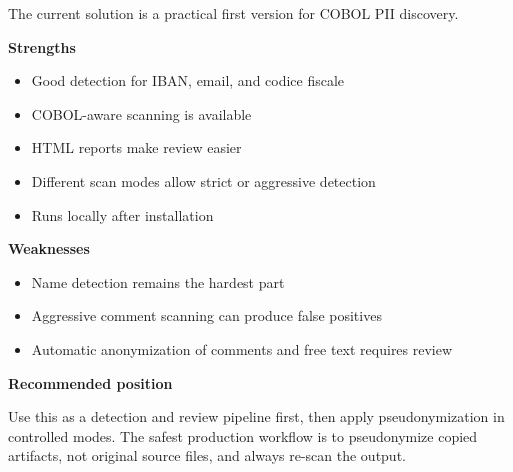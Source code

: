 ﻿\documentclass[11pt,a4paper]{article}
\begin{document}
The current solution is a practical first version for COBOL PII discovery.

\textbf{Strengths}

\begin{itemize}
  \item Good detection for IBAN, email, and codice fiscale
  \item COBOL-aware scanning is available
  \item HTML reports make review easier
  \item Different scan modes allow strict or aggressive detection
  \item Runs locally after installation
\end{itemize}

\textbf{Weaknesses}

\begin{itemize}
  \item Name detection remains the hardest part
  \item Aggressive comment scanning can produce false positives
  \item Automatic anonymization of comments and free text requires review
\end{itemize}

\textbf{Recommended position}

Use this as a detection and review pipeline first, then apply pseudonymization in controlled modes. The safest production workflow is to pseudonymize copied artifacts, not original source files, and always re-scan the output.
\end{document}
